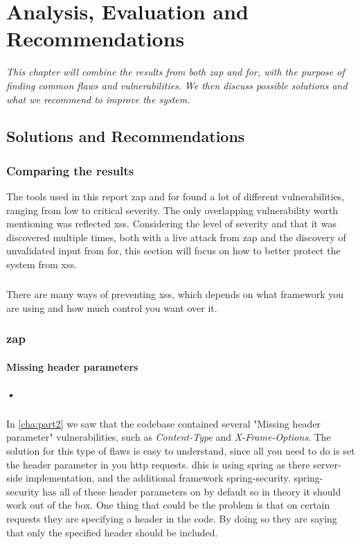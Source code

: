 \documentclass[11pt,english,a4paper]{report}
\begin{document}
\chapter{Analysis, Evaluation and Recommendations}
\label{cha:part3}

\textit{This chapter will combine the results from both \gls{zap} and \gls{for}, with the purpose of finding common flaws and vulnerabilities.}
\textit{We then discuss possible solutions and what we recommend to improve the system.}

\section{Solutions and Recommendations}

\subsection{Comparing the results}
The tools used in this report \gls{zap} and \gls{for} found a lot of different vulnerabilities, ranging from low to critical severity.
The only overlapping vulnerability worth mentioning was reflected \gls{xss}.
Considering the level of severity and that it was discovered multiple times, both with a live attack from \gls{zap} and the discovery of unvalidated input from \gls{for}, this section will focus on how to better protect the system from \gls{xss}.
\paragraph{}

There are many ways of preventing \gls{xss}, which depends on what framework you are using and how much control you want over it.


\subsection{\gls{zap}}

\subsubsection{Missing header parameters}
\paragraph{•}

In \ref{cha:part2} we saw that the codebase contained several "Missing header parameter" vulnerabilities, such as \textit{Content-Type} and 
\textit{X-Frame-Options}.
The solution for this type of flaws is easy to understand, since all you need to do is set the header parameter in you \gls{http} requests.
\gls{dhis} is using \gls{spring} as there server-side implementation, and the additional framework \gls{spring}-security.
\gls{spring}-security has all of these header parameters on by default so in theory it should work out of the box.
One thing that could be the problem is that on certain requests they are specifying a header in the code.
By doing so they are saying that only the specified header should be included.
\end{document}
